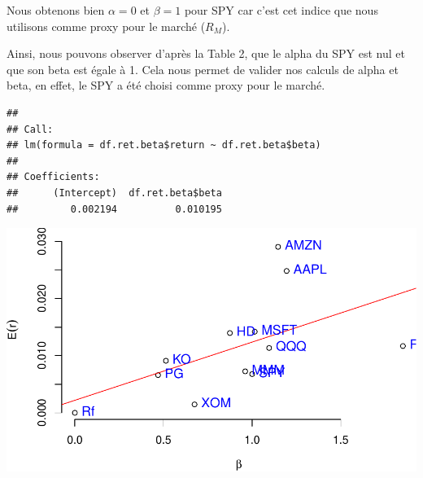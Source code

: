 \documentclass[
]{article}
\begin{document}
\begin{table}[H]

\caption{\label{tab:unnamed-chunk-7}Alpha and Beta for each asset}
\centering
{}
\end{table}

Nous obtenons bien \(\alpha = 0\) et \(\beta = 1\) pour SPY car c'est
cet indice que nous utilisons comme proxy pour le marché (\(R_{M}\)).

Ainsi, nous pouvons observer d'après la Table 2, que le alpha du SPY est
nul et que son beta est égale à 1. Cela nous permet de valider nos
calculs de alpha et beta, en effet, le SPY a été choisi comme proxy pour
le marché.

\begin{verbatim}
## 
## Call:
## lm(formula = df.ret.beta$return ~ df.ret.beta$beta)
## 
## Coefficients:
##      (Intercept)  df.ret.beta$beta  
##         0.002194          0.010195
\end{verbatim}

\includegraphics{TP-3_files/figure-latex/unnamed-chunk-8-1.pdf}
\end{document}
